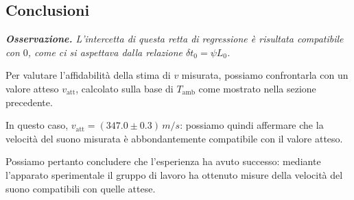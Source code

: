\documentclass{article}
\begin{document}
\pagebreak
\subsection{Conclusioni}
\emph{
  \textbf{Osservazione.}
  L'intercetta di questa retta di regressione è
  risultata compatibile con $0$, come ci si aspettava
  dalla relazione $\delta t_0 = \psi L_0$.
}

\vspace{2mm}
Per valutare l'affidabilità della stima di $v$ misurata,
possiamo confrontarla con un valore atteso $v_\text{att}$,
calcolato sulla base di $T_\text{amb}$ come mostrato nella
sezione precedente.

In questo caso, $v_\text{att} = (347.0\pm0.3)\,\unit{m \per s}$:
possiamo quindi affermare che la velocità del suono misurata
è abbondantemente compatibile con il valore atteso.

\vspace{5mm}
Possiamo pertanto concludere che l'esperienza ha avuto successo:
mediante l'apparato sperimentale il gruppo di lavoro ha ottenuto
misure della velocità del suono compatibili con quelle attese.
\end{document}
